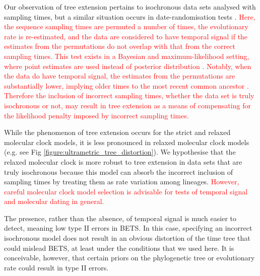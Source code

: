 \documentclass[10pt,letterpaper]{article}
\begin{document}
Our observation of tree extension pertains to isochronous data sets analysed with sampling times, but a similar situation occurs in date-randomisation tests \cite{ramsden2009hantavirus}. \textcolor{red}{Here, the sequence sampling times are permuted a number of times, the evolutionary rate is re-estimated, and the data are considered to have temporal signal if the estimates from the permutations do not overlap with that from the correct sampling times. This test exists in a Bayesian and maximum-likelihood setting, where point estimates are used instead of posterior distribution \cite{duchene2018inferring}. Notably, when the data do have temporal signal, the estimates from the permutations are substantially lower, implying older times to the most recent common ancestor \cite{rieux2016inferences}. Therefore the inclusion of incorrect sampling times, whether the data set is truly isochronous or not, may result in tree extension as a means of compensating for the likelihood penalty imposed by incorrect sampling times.}

While the phenomenon of tree extension occurs for the strict and relaxed molecular clock models, it is less pronounced in relaxed molecular clock models (e.g. see Fig \ref{figure:ultrametric_tree_distortion}). We hypothesise that the relaxed molecular clock is more robust to tree extension in data sets that are truly isochronous because this model can absorb the incorrect inclusion of sampling times by treating them as rate variation among lineages. \textcolor{red}{However, careful molecular clock model selection is advisable for tests of temporal signal and molecular dating in general.}

The presence, rather than the absence, of temporal signal is much easier to detect, meaning low type II errors in BETS. In this case, specifying an incorrect isochronous model does not result in an obvious distortion of the time tree that could mislead BETS, at least under the conditions that we used here. It is conceivable, however, that certain priors on the phylogenetic tree or evolutionary rate could result in type II errors. 
\end{document}
